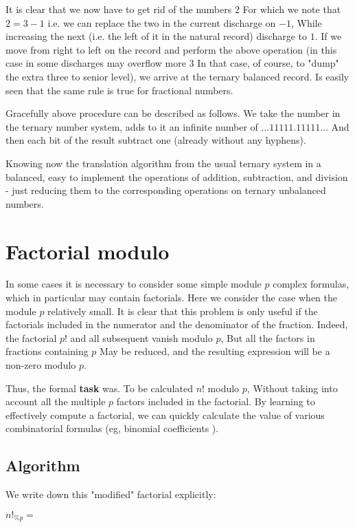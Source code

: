 It is clear that we now have to get rid of the numbers $2$ For which we note that $2 = 3 - 1$ i.e. we can replace the two in the current discharge on $-1$, While increasing the next (i.e. the left of it in the natural record) discharge to $1$. If we move from right to left on the record and perform the above operation (in this case in some discharges may overflow more $3$ In that case, of course, to "dump" the extra three to senior level), we arrive at the ternary balanced record. Is easily seen that the same rule is true for fractional numbers.

Gracefully above procedure can be described as follows. We take the number in the ternary number system, adds to it an infinite number of $\ldots 11111.11111 \ldots$ And then each bit of the result subtract one (already without any hyphens).

Knowing now the translation algorithm from the usual ternary system in a balanced, easy to implement the operations of addition, subtraction, and division - just reducing them to the corresponding operations on ternary unbalanced numbers.

\section{ Factorial modulo }
In some cases it is necessary to consider some simple module $p$ complex formulas, which in particular may contain factorials. Here we consider the case when the module $p$ relatively small. It is clear that this problem is only useful if the factorials included in the numerator and the denominator of the fraction. Indeed, the factorial $p!$ and all subsequent vanish modulo $p$, But all the factors in fractions containing $p$ May be reduced, and the resulting expression will be a non-zero modulo $p$.

Thus, the formal \textbf{task} was. To be calculated $n!$ modulo $p$, Without taking into account all the multiple $p$ factors included in the factorial. By learning to effectively compute a factorial, we can quickly calculate the value of various combinatorial formulas (eg, binomial coefficients ).

\subsection{ Algorithm }

We write down this "modified" factorial explicitly:

$n! _ {\% p} =$


